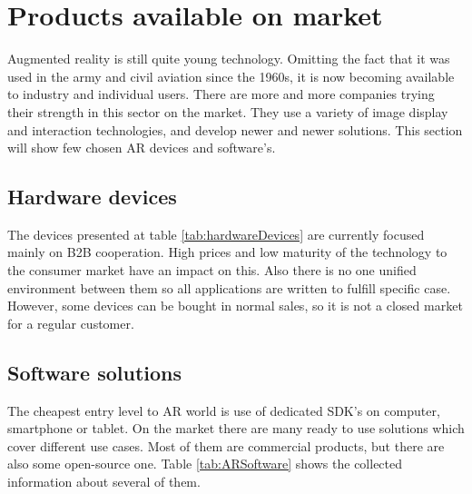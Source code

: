 \documentclass[printmode,en]{mgr}
\begin{document}
\section{Products available on market}
Augmented reality is still quite young technology. Omitting the fact that it was used in the army and civil aviation since the 1960s, it is now becoming available to industry and individual users. There are more and more companies trying their strength in this sector on the market. They use a variety of image display and interaction technologies, and develop newer and newer solutions. This section will show few chosen AR devices and software's.

\subsection{Hardware devices}
The devices presented at table \ref{tab:hardwareDevices} are currently focused mainly on B2B cooperation. High prices and low maturity of the technology to the consumer market have an impact on this. Also there is no one unified environment between them so all applications are written to fulfill specific case. However, some devices can be bought in normal sales, so it is not a closed market for a regular customer.

\subsection{Software solutions}
The cheapest entry level to AR world is use of dedicated SDK's on computer, smartphone or tablet. On the market there are many ready to use solutions which cover different use cases. Most of them are commercial products, but there are also some open-source one. Table \ref{tab:ARSoftware} shows the collected information about several of them.

\end{document}
